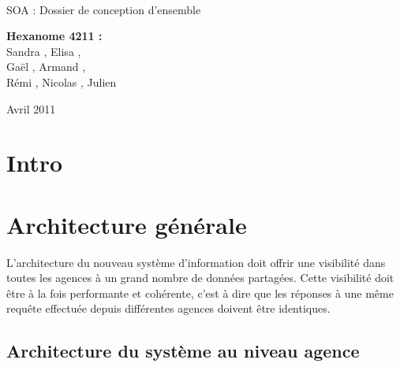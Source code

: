 \documentclass[a4paper]{article}
\begin{document}
\begin{titlepage}
~ 
\vfill
	\begin{center}
		\begin{Huge}
		SOA : Dossier de conception d'ensemble\\
		\end{Huge} 
\vfill
		\textbf{Hexanome 4211 :} 
		\\Sandra {}, Elisa , 
		\\Gaël , Armand , 
		\\Rémi , Nicolas , Julien \\

\vfill		
		\begin{Large}
		Avril 2011
		\end{Large}
\vfill

	\end{center}
\vfill
\end{titlepage}

\newpage
\tableofcontents
\newpage

\section*{Intro}

\section{Architecture générale}


L'architecture du nouveau système d'information doit offrir une visibilité dans toutes les agences à un grand nombre de données partagées. Cette visibilité doit être à la fois performante et cohérente, c'est à dire que les réponses à une même requête effectuée depuis différentes agences doivent être identiques.

\subsection{Architecture du système au niveau agence}
\end{document}
